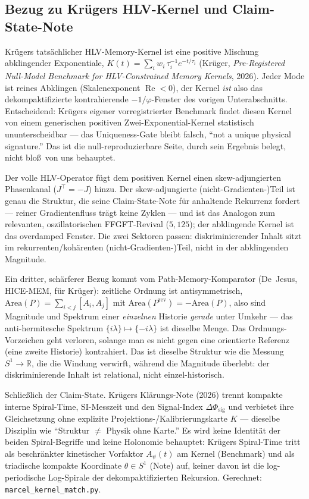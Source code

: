 \subsection{Bezug zu Kr\"ugers HLV-Kernel und Claim-State-Note}
Kr\"ugers tats\"achlicher HLV-Memory-Kernel ist eine positive Mischung abklingender Exponentiale,
$K(t)=\sum_i w_i\,\tau_i^{-1}e^{-t/\tau_i}$ (Kr\"uger, \emph{Pre-Registered Null-Model Benchmark
for HLV-Constrained Memory Kernels}, 2026). Jeder Mode ist reines Abklingen (Skalenexponent
$\operatorname{Re}<0$), der Kernel \emph{ist} also das dekompaktifizierte kontrahierende
$-1/\varphi$-Fenster des vorigen Unterabschnitts. Entscheidend: Kr\"ugers eigener
vorregistrierter Benchmark findet diesen Kernel von einem generischen positiven
Zwei-Exponential-Kernel statistisch ununterscheidbar --- das Uniqueness-Gate bleibt falsch,
\enquote{not a unique physical signature.} Das ist die null-reproduzierbare Seite, durch sein
Ergebnis belegt, nicht blo\ss\ von uns behauptet.

Der volle HLV-Operator f\"ugt dem positiven Kernel einen skew-adjungierten Phasenkanal
($J^\top=-J$) hinzu. Der skew-adjungierte (nicht-Gradienten-)Teil ist genau die Struktur, die
seine Claim-State-Note f\"ur anhaltende Rekurrenz fordert --- reiner Gradientenfluss tr\"agt keine
Zyklen --- und ist das Analogon zum relevanten, oszillatorischen FFGFT-Revival ($5{,}125$); der
abklingende Kernel ist das overdamped Fenster. Die zwei Sektoren passen: diskriminierender Inhalt
sitzt im rekurrenten/koh\"arenten (nicht-Gradienten-)Teil, nicht in der abklingenden Magnitude.

Ein dritter, sch\"arferer Bezug kommt vom Path-Memory-Komparator (De~Jesus, HICE-MEM, f\"ur
Kr\"uger): zeitliche Ordnung ist antisymmetrisch, $\mathrm{Area}(P)=\sum_{i<j}[A_i,A_j]$ mit
$\mathrm{Area}(P^{\mathrm{rev}})=-\mathrm{Area}(P)$, also sind Magnitude und Spektrum einer
\emph{einzelnen} Historie \emph{gerade} unter Umkehr --- das anti-hermitesche Spektrum
$\{i\lambda\}\mapsto\{-i\lambda\}$ ist dieselbe Menge. Das Ordnungs-Vorzeichen geht verloren,
solange man es nicht gegen eine orientierte Referenz (eine zweite Historie) kontrahiert. Das ist
dieselbe Struktur wie die Messung $S^1\to\mathbb{R}$, die die Windung verwirft, w\"ahrend die
Magnitude \"uberlebt: der diskriminierende Inhalt ist relational, nicht einzel-historisch.

Schlie\ss lich der Claim-State. Kr\"ugers Klärungs-Note (2026) trennt kompakte interne
Spiral-Time, SI-Messzeit und den Signal-Index $\Delta\Phi_{\mathrm{sig}}$ und verbietet ihre
Gleichsetzung ohne explizite Projektions-/Kalibrierungskarte $K$ --- dieselbe Disziplin wie
\enquote{Struktur $\neq$ Physik ohne Karte.} Es wird keine Identit\"at der beiden Spiral-Begriffe
und keine Holonomie behauptet: Kr\"ugers Spiral-Time tritt als beschr\"ankter kinetischer
Vorfaktor $A_\psi(t)$ am Kernel (Benchmark) und als triadische kompakte Koordinate
$\theta\in S^1$ (Note) auf, keiner davon ist die log-periodische Log-Spirale der
dekompaktifizierten Rekursion. Gerechnet: \texttt{marcel\_kernel\_match.py}.

